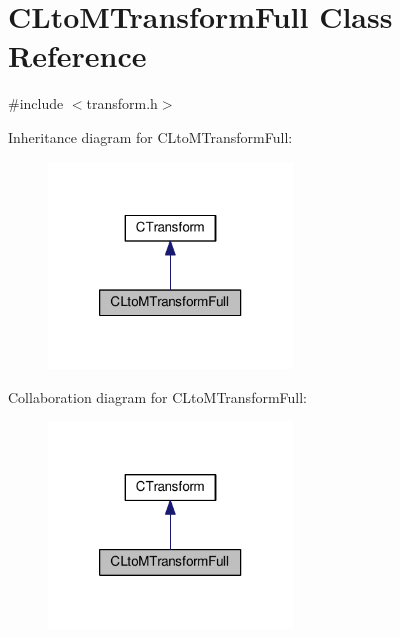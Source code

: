 \hypertarget{classCLtoMTransformFull}{\section{C\-Lto\-M\-Transform\-Full Class Reference}
\label{classCLtoMTransformFull}
}


{\ttfamily \#include $<$transform.\-h$>$}



Inheritance diagram for C\-Lto\-M\-Transform\-Full\-:\nopagebreak
\begin{figure}[H]
\begin{center}
\leavevmode
\includegraphics[width=184pt]{classCLtoMTransformFull__inherit__graph}
\end{center}
\end{figure}


Collaboration diagram for C\-Lto\-M\-Transform\-Full\-:\nopagebreak
\begin{figure}[H]
\begin{center}
\leavevmode
\includegraphics[width=184pt]{classCLtoMTransformFull__coll__graph}
\end{center}
\end{figure}
